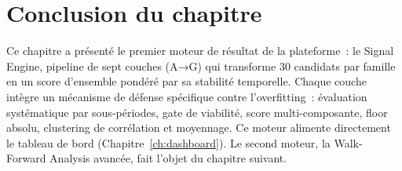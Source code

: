 \section*{Conclusion du chapitre}

Ce chapitre a présenté le premier moteur de résultat de la plateforme~: le Signal Engine,
pipeline de sept couches (A→G) qui transforme 30 candidats par famille en un score
d'ensemble pondéré par sa stabilité temporelle. Chaque couche intègre un mécanisme de défense
spécifique contre l'overfitting~: évaluation systématique par sous-périodes, gate de
viabilité, score multi-composante, floor absolu, clustering de corrélation et moyennage.
Ce moteur alimente directement le tableau de bord (Chapitre~\ref{ch:dashboard}).
Le second moteur, la Walk-Forward Analysis avancée, fait l'objet du chapitre suivant.
